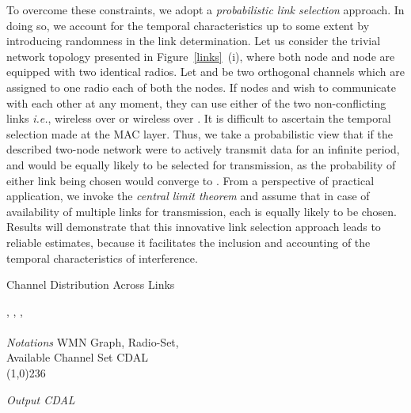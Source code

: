 \documentclass[conference]{IEEEtran}
\begin{document}
To overcome these constraints, we adopt a \textit{probabilistic link selection} approach. In doing so, we account for the temporal characteristics up to some extent by introducing randomness in the link determination. Let us consider the trivial network topology presented in Figure~\ref{links}~(i), where both node  and node  are equipped with two identical radios. Let  and  be two orthogonal channels which are assigned to one radio each of both the nodes. If nodes  and  wish to communicate with each other at any moment, they can use either of the two non-conflicting links \emph{i.e.}, wireless  over  or wireless  over . It is difficult to ascertain the temporal selection made at the MAC layer. Thus, we take a probabilistic view  that if the described two-node network were to actively transmit data for an infinite period,  and  would be equally likely to be selected for transmission, as the probability of either link being 
chosen would converge to . From a perspective of practical application, we invoke the \textit{central limit theorem} and assume that in case of availability of multiple links for transmission, each is equally likely to be chosen. Results will demonstrate that this innovative link selection approach leads to reliable estimates, because it facilitates the inclusion and accounting of the temporal characteristics of interference. 

\renewcommand{\algorithmicrequire}{\textbf{Input:}}
\renewcommand{\algorithmicensure}{\textbf{Output:}}
\begin{algorithm}[htb!] 
\caption{Channel Distribution Across Links}
\label{CDAL}
\begin{algorithmic}[1]
{\fontsize{9}{10}
\REQUIRE , , ,\\  \\
\textit{Notations}     WMN Graph,   Radio-Set,\\
		     Available Channel Set
\ENSURE CDAL \\
\line(1,0){236}
\STATE  {}
\STATE  {}
\STATE 

\STATE \textit{Output CDAL} 
}
\end{algorithmic}
\end{algorithm}
\end{document}

